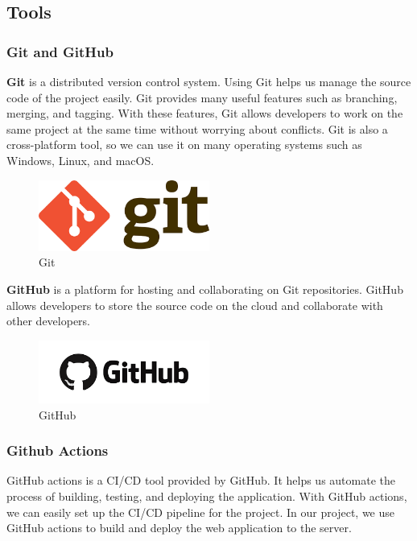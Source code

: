 \subsection{Tools}

\subsubsection{Git and GitHub}
\textbf{Git} is a distributed version control system. Using Git helps us manage the source code of the project easily. Git provides many useful features such as branching, merging, and tagging. With these features, Git allows developers to work on the same project at the same time without worrying about conflicts. Git is also a cross-platform tool, so we can use it on many operating systems such as Windows, Linux, and macOS.

\begin{figure}[ht]
    \centering
    \includegraphics[width=0.5\textwidth]{../Images/8.Technology_Stack/git_logo.png}
    \caption{Git}
    \label{fig:git}
\end{figure}

\noindent \textbf{GitHub} is a platform for hosting and collaborating on Git repositories. GitHub allows developers to store the source code on the cloud and collaborate with other developers.

\begin{figure}[ht]
    \centering
    \includegraphics[width=0.5\textwidth]{../Images/8.Technology_Stack/github_logo.png}
    \caption{GitHub}
    \label{fig:github}
\end{figure}

\subsubsection{Github Actions}
GitHub actions is a CI/CD tool provided by GitHub. It helps us automate the process of building, testing, and deploying the application. With GitHub actions, we can easily set up the CI/CD pipeline for the project. In our project, we use GitHub actions to build and deploy the web application to the server.

